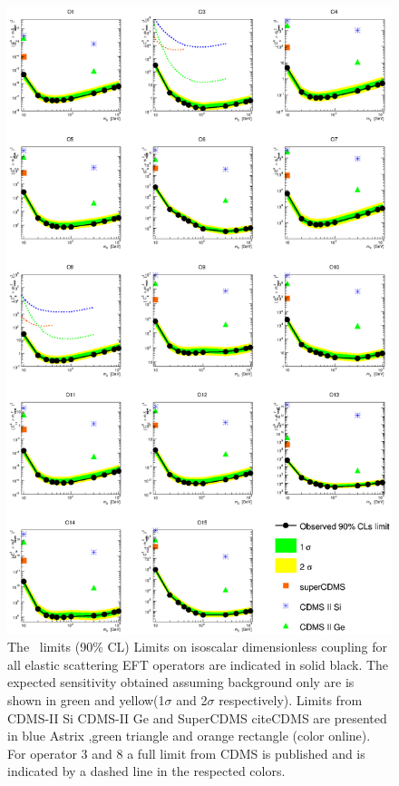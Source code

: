 \begin{figure}
\begin{minipage}{1.\linewidth}{}
\centerline{\includegraphics[width=\textwidth,height=\textheight,keepaspectratio]{Figures/ElasticAllLimitCDMS.eps}}
\end{minipage}
\caption{The \Xehund\ limits (90\% CL) Limits on isoscalar dimensionless coupling for all elastic scattering EFT operators are indicated in solid black. The expected sensitivity obtained assuming background only are is shown in green and yellow(1$\sigma$ and 2$\sigma$ respectively). Limits from CDMS-II Si CDMS-II Ge and SuperCDMS cite{CDMS} are presented in blue Astrix ,green triangle and orange rectangle (color online). For operator 3 and 8 a full limit from CDMS is published and is indicated by a dashed line in the respected colors.}
\label{fig:elasticLimit}
\end{figure}


